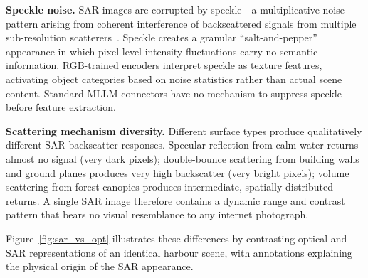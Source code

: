 \textbf{Speckle noise.}
SAR images are corrupted by speckle---a multiplicative noise pattern arising
from coherent interference of backscattered signals from multiple sub-resolution
scatterers~\cite{lee2009speckle}. Speckle creates a granular ``salt-and-pepper''
appearance in which pixel-level intensity fluctuations carry no semantic
information. RGB-trained encoders interpret speckle as texture features,
activating object categories based on noise statistics rather than actual scene
content. Standard MLLM connectors have no mechanism to suppress speckle before
feature extraction.

\textbf{Scattering mechanism diversity.}
Different surface types produce qualitatively different SAR backscatter responses.
Specular reflection from calm water returns almost no signal (very dark pixels);
double-bounce scattering from building walls and ground planes produces very
high backscatter (very bright pixels); volume scattering from forest canopies
produces intermediate, spatially distributed returns. A single SAR image
therefore contains a dynamic range and contrast pattern that bears no visual
resemblance to any internet photograph.

Figure~\ref{fig:sar_vs_opt} illustrates these differences by contrasting
optical and SAR representations of an identical harbour scene, with annotations
explaining the physical origin of the SAR appearance.

